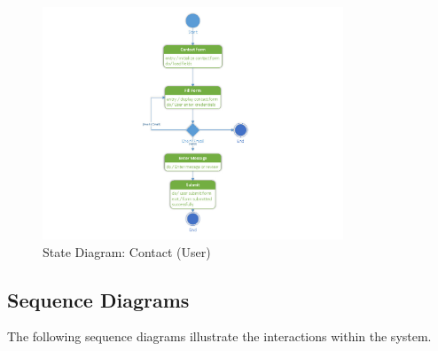 \documentclass[12pt]{report}
\begin{document}
\begin{figure}[ht]
    \centering
    \includegraphics[width=0.8\textwidth]{Media/Binder2.pdf_Page_20.jpg} %
    \caption{State Diagram: Contact (User)}
    \label{fig:drawing1}
\end{figure}

\clearpage
\subsection{Sequence Diagrams}
The following sequence diagrams illustrate the interactions within the system. 
\end{document}
